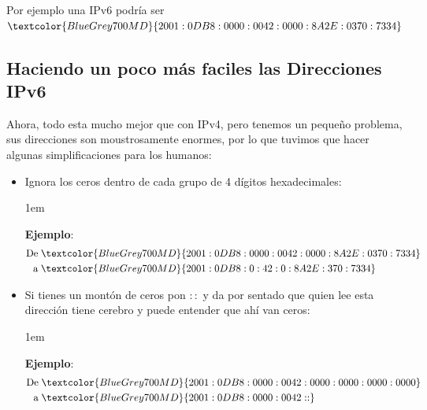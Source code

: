 \documentclass[12pt, fleqn]{report}                             %
\newenvironment{SmallIndentation}[1][0.75em]                    %
        {\begin{adjustwidth}{#1}{}\begin{footnotesize}}             %
        {\end{footnotesize}\end{adjustwidth}}                       %
\theoremstyle{break}                                            %
\newcommand{\Color}[2]{\textcolor{#1}{#2}}                      %
\begin{document}
            Por ejemplo una IPv6 podría ser $\Color{BlueGrey700MD}{2001:0DB8:0000:0042:0000:8A2E:0370:7334}$


            \clearpage
            \subsection{Haciendo un poco más faciles las Direcciones IPv6}

                Ahora, todo esta mucho mejor que con IPv4, pero tenemos un pequeño
                problema, sus direcciones son moustrosamente enormes, por lo que tuvimos
                que hacer algunas simplificaciones para los humanos:

                \begin{itemize}
                    \item
                        Ignora los ceros dentro de cada grupo de 4 dígitos hexadecimales:

                        \begin{SmallIndentation}[1em]
                            \textbf{Ejemplo}:
                            \begin{align*}
                                \text{De} \; &\Color{BlueGrey700MD}{2001:0DB8:0000:0042:0000:8A2E:0370:7334}  \\
                                \text{a}  \; &\Color{BlueGrey700MD}{2001:0DB8:0:42:0:8A2E:370:7334} 
                            \end{align*}
                        
                        \end{SmallIndentation}
                        
                    \item 
                        Si tienes un montón de ceros pon $::$ y da por sentado que quien lee esta dirección
                        tiene cerebro y puede entender que ahí van ceros:

                        \begin{SmallIndentation}[1em]
                            \textbf{Ejemplo}:
                            \begin{align*}
                                \text{De} \; &\Color{BlueGrey700MD}{2001:0DB8:0000:0042:0000:0000:0000:0000}   \\
                                \text{a}  \; &\Color{BlueGrey700MD}{2001:0DB8:0000:0042::}         
                            \end{align*}
                        
                        \end{SmallIndentation}

                \end{itemize}
\end{document}
